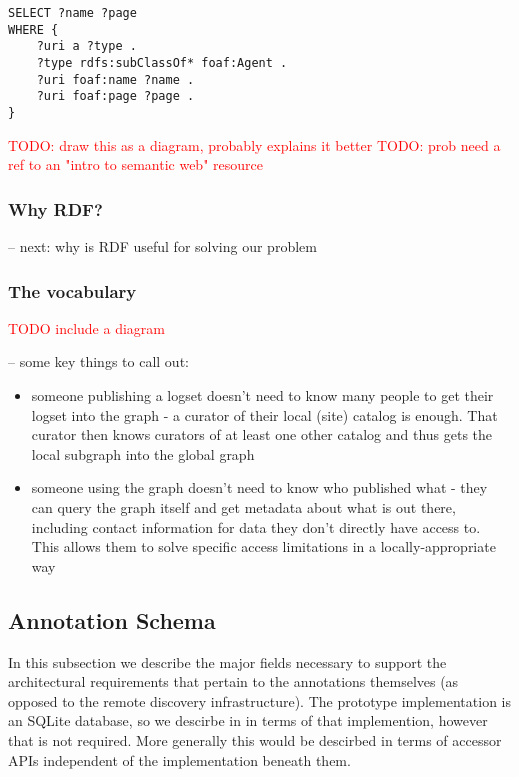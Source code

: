 \begin{verbatim}
SELECT ?name ?page 
WHERE {
    ?uri a ?type .
    ?type rdfs:subClassOf* foaf:Agent .
    ?uri foaf:name ?name .
    ?uri foaf:page ?page .
}
\end{verbatim}

\textcolor{red}{TODO: draw this as a diagram, probably explains it better}
\textcolor{red}{TODO: prob need a ref to an "intro to semantic web" resource}

\subsubsection{Why RDF?}

-- next: why is RDF useful for solving our problem

\subsubsection{The vocabulary}

\textcolor{red}{TODO include a diagram}


-- some key things to call out:
\begin{itemize}
\item someone publishing a logset doesn't need to know many people to get their 
      logset into the graph - a curator of their local (site) catalog is enough. 
      That curator then knows curators of at least one other catalog and thus 
      gets the local 
      subgraph into the global graph
\item someone using the graph doesn't need to know who published what - they can
      query the graph itself and get metadata about what is out there, including contact 
      information for data they don't directly have access to. This allows them to 
      solve specific access limitations in a locally-appropriate way
\end{itemize}

 
\subsection{Annotation Schema}

In this subsection we describe the major fields necessary to support the
architectural requirements that pertain to the annotations themselves
(as opposed to the remote discovery infrastructure). The prototype
implementation is an SQLite database, so we descirbe in in terms
of that implemention, however that is not required. More generally
this would be descirbed in terms of accessor APIs independent of
the implementation beneath them.

